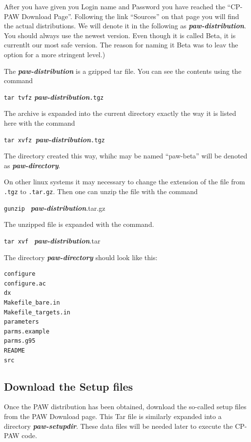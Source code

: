 \documentclass[a4paper,10pt]{report}
\newcommand{\myspec}[1]{\textbf{\textit{#1}}}
\newcommand{\mytt}[1]{{\tt #1}}
\begin{document}
After you have given you Login name and Password you have reached the
``CP-PAW Download Page''. Following the link ``Sources'' on that page
you will find the actual distributions. We will denote it in the
following as \myspec{paw-distribution}. You
should always use the newest version. Even though it is called Beta,
it is currentlt our most safe version. The reason for naming it Beta
was to leav the option for a more stringent level.)

The \myspec{paw-distribution} is a gzipped tar file. You can see the
contents using the command
\begin{center} 
\mytt{tar tvfz} \myspec{paw-distribution}\mytt{.tgz}
\end{center}
The archive is expanded into the current directory exactly the way it
is listed here with the command
\begin{center}
\mytt{tar xvfz }\myspec{paw-distribution}\mytt{.tgz}
\end{center}
The directory created this way, whihc may be named ``paw-beta'' will
be denoted as \myspec{paw-directory}.


On other linux systems it may necessary to change the extension of the
file from \mytt{.tgz} to \mytt{.tar.gz}. Then one can unzip the file
with the command
\begin{center}
\mytt{gunzip } \myspec{paw-distribution}.tar.gz
\end{center}
The unzipped file is expanded with the command.
\begin{center}
\mytt{tar xvf } \myspec{paw-distribution}.tar
\end{center}

The directory \myspec{paw-directory} should look like this:
\begin{verbatim}
configure
configure.ac
dx
Makefile_bare.in
Makefile_targets.in
parameters
parms.example
parms.g95
README
src
\end{verbatim}

\subsection{Download the Setup files}
Once the PAW distribution has been obtained, download the so-called
setup files from the PAW Download page. This Tar file is similarly
expanded into a directory \myspec{paw-setupdir}. These data files will
be needed later to execute the CP-PAW code.
\end{document}
